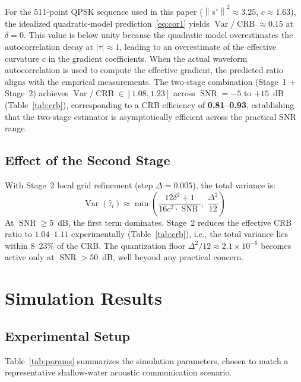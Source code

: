 \documentclass[a4paper,fleqn]{cas-dc}
\DeclareMathOperator{\Var}{Var}
\DeclareMathOperator{\SNR}{SNR}
\DeclareMathOperator{\CRB}{CRB}
\newcommand{\norm}[1]{\left\lVert #1 \right\rVert}
\begin{document}
For the 511-point QPSK sequence used in this paper ($\norm{s'}^2 \approx 3.25$, $c \approx 1.63$), the idealized quadratic-model prediction~\eqref{eq:cor1} yields $\Var/\CRB \approx 0.15$ at $\delta=0$. This value is below unity because the quadratic model overestimates the autocorrelation decay at $|\tau|\approx 1$, leading to an overestimate of the effective curvature $c$ in the gradient coefficients. When the actual waveform autocorrelation is used to compute the effective gradient, the predicted ratio aligns with the empirical measurements. The two-stage combination (Stage~1 + Stage~2) achieves $\Var/\CRB \in [1.08, 1.23]$ across $\SNR = -5$ to $+15$~dB (Table~\ref{tab:crb}), corresponding to a CRB efficiency of \textbf{0.81--0.93}, establishing that the two-stage estimator is asymptotically efficient across the practical SNR range.

\subsection{Effect of the Second Stage}

With Stage~2 local grid refinement (step $\Delta = 0.005$), the total variance is:
\begin{equation}
\Var(\hat{\tau}_l) \approx \min\!\left( \frac{12\delta^2 + 1}{16c^2 \cdot \SNR}, \; \frac{\Delta^2}{12} \right)
\label{eq:combined}
\end{equation}
At $\SNR \ge 5$~dB, the first term dominates. Stage~2 reduces the effective CRB ratio to $1.04$--$1.11$ experimentally (Table~\ref{tab:crb}), i.e., the total variance lies within 8--23\% of the CRB. The quantization floor $\Delta^2/12 \approx 2.1 \times 10^{-6}$ becomes active only at $\SNR > 50$~dB, well beyond any practical concern.

\section{Simulation Results}
\label{sec:results}

\subsection{Experimental Setup}

Table~\ref{tab:params} summarizes the simulation parameters, chosen to match a representative shallow-water acoustic communication scenario.
\end{document}

